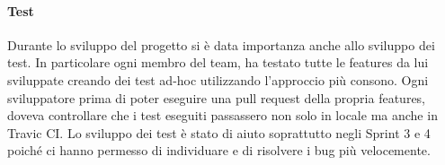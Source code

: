\paragraph{Test}
Durante lo sviluppo del progetto si è data importanza anche allo sviluppo dei test.
In particolare ogni membro del team, ha testato tutte le features da lui sviluppate creando dei test ad-hoc utilizzando l'approccio più consono.
Ogni sviluppatore prima di poter eseguire una pull request della propria features, doveva controllare che i test eseguiti passassero non solo in locale ma anche in Travic CI.\@
Lo sviluppo dei test è stato di aiuto soprattutto negli Sprint 3 e 4 poiché ci hanno permesso di individuare e di risolvere i bug più velocemente.